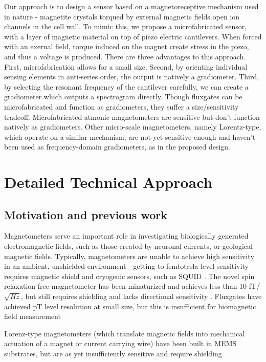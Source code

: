 Our approach is to design a sensor based on a magnetoreceptive mechanism used in nature - magnetite crystals torqued by external magnetic fields open ion channels in the cell wall. To mimic this, we propose a microfabricated sensor, with a layer of magnetic material on top of piezo electric cantilevers. When forced with an exernal field, torque induced on the magnet create stress in the piezo, and thus a voltage is produced. There are three advantages to this approach. First, microfabrication allows for a small size. Second, by orienting individual sensing elements in anti-series order, the output is natively a gradiometer. Third, by selecting the resonant frequency of the cantilever carefully, we can create a gradiometer which outputs a spectrogram directly. Though fluxgates can be microfabricated and function as gradiometers, they suffer a size/sensitivity tradeoff. Microfabricated atmonic magnetometers are sensitive but don't function natively as gradiometers. Other micro-scale magnetometers, namely Lorentz-type, which operate on a similar mechanism, are not yet sensitive enough and haven't been used as frequency-domain gradiometers, as in the proposed design.

\section{Detailed Technical Approach}

\subsection{Motivation and previous work}

Magnetometers serve an important role in investigating biologically generated electromagnetic fields, such as those created by neuronal currents, or geological magnetic fields. Typically, magnetometers are unable to achieve high sensitivity in an ambient, unshielded environment - getting to femtotesla level sensitivity requires magnetic shield and cryogenic sensors, such as SQUID \cite{lenz2006magnetic}. The novel spin relaxation free magnetometer has been minaturized and achieves less than 10 fT/$\sqrt{Hz}$, but still requires shielding and lacks directional sensitivity \cite{shah2013compact}. Fluxgates have achieved pT level resolution at small size, but this is insufficient for biomagnetic field measurement \cite{sasada2002orthogonal,uchiyama2014highly,sasada2014fundamental} 

Lorenz-type magnetometers (which translate magnetic fields into mechanical actuation of a magnet or current carrying wire) have been built in MEMS substrates, but are as yet insufficiently sensitive and require shielding \cite{sinha201627,kyynarainen20083d,kumar2015ultra,thompson2009parametrically}

